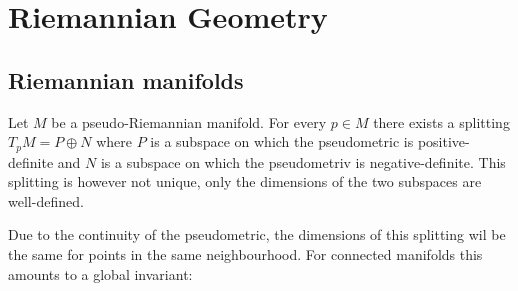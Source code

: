 \chapter{Riemannian Geometry}

\section{Riemannian manifolds}

	
	\begin{property}
		Let $M$ be a pseudo-Riemannian manifold. For every $p\in M$ there exists a splitting $T_pM = P\oplus N$ where $P$ is a subspace on which the pseudometric is positive-definite and $N$ is a subspace on which the pseudometriv is negative-definite. This splitting is however not unique, only the dimensions of the two subspaces are well-defined.
	\end{property}
	Due to the continuity of the pseudometric, the dimensions of this splitting wil be the same for points in the same neighbourhood. For connected manifolds this amounts to a global invariant:
